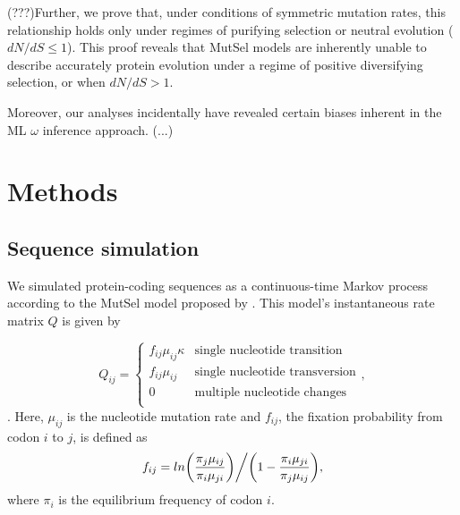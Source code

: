 \documentclass[11pt]{article}
\begin{document}
(???)Further, we prove that, under conditions of symmetric mutation rates, this relationship holds only under regimes of purifying selection or neutral evolution ($dN/dS \leq 1$). This proof reveals that MutSel models are inherently unable to describe accurately protein evolution under a regime of positive diversifying selection, or when $dN/dS > 1$.

Moreover, our analyses incidentally have revealed certain biases inherent in the ML $\omega$ inference approach. (...)
 


\section*{Methods}

\subsection*{Sequence simulation}
We simulated protein-coding sequences as a continuous-time Markov
process \cite{Yang2006} according to the MutSel model proposed by \cite{HalpernBruno1998}. This model's instantaneous rate matrix $Q$ is given by 

\begin{equation}
Q_{ij} = \left\{ \begin{array}{rl}
              f_{ij}\mu_{ij}\kappa               &\mbox{single nucleotide transition} \\
              f_{ij}\mu_{ij}                          &\mbox{single nucleotide transversion} \\
              0                                           &\mbox{multiple nucleotide changes} \\             
         \end{array} \right.,
\end{equation}. Here, $\mu_{ij}$ is the nucleotide mutation rate and $f_{ij}$, the fixation probability from codon $i$ to $j$, is defined as \begin{equation}f_{ij} = ln\bigg{(}\frac{\pi_j\mu_{ij}}{\pi_i\mu_{ji}}\bigg{)}\bigg{/}\bigg{(}1 - \frac{\pi_i\mu_{ji}}{\pi_j\mu_{ij}}\bigg{)},\end{equation} where $\pi_i$ is the equilibrium frequency of codon $i$.
\end{document}
